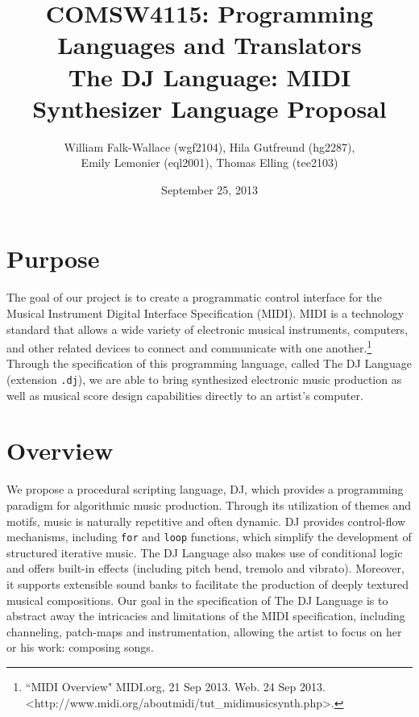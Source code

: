 \documentclass[letterpaper]{article}
\author{William Falk-Wallace (wgf2104), Hila Gutfreund (hg2287), \\Emily Lemonier (eql2001), Thomas Elling (tee2103)}
\title{COMSW4115: Programming Languages and Translators\\The DJ Language: MIDI Synthesizer Language Proposal}
\date{September 25, 2013}
\begin{document}
\maketitle
\tableofcontents 
\pagebreak[4]

\section{Purpose}
The goal of our project is to create a programmatic control interface for the Musical Instrument Digital Interface Specification (MIDI). MIDI is a technology standard that allows a wide variety of electronic musical instruments, computers, and other related devices to connect and communicate with one another.\footnote[1]{``MIDI Overview" MIDI.org, 21 Sep 2013. Web. 24 Sep 2013. \textless http://www.midi.org/aboutmidi/tut\_midimusicsynth.php\textgreater.}  
Through the specification of this programming language, called The DJ Language (extension \texttt{.dj}), we are able to bring synthesized electronic music production as well as musical score design capabilities directly to an artist's computer. 


\section{Overview}

We propose a procedural scripting language, DJ, which provides a programming paradigm for algorithmic music production. Through its utilization of themes and motifs, music is naturally repetitive and often dynamic. DJ provides control-flow mechanisms, including \texttt{for} and \texttt{loop} functions, which simplify the development of structured iterative music. The DJ Language also makes use of conditional logic and offers built-in effects (including pitch bend, tremolo and vibrato). Moreover, it supports extensible sound banks to facilitate the production of deeply textured musical compositions. Our goal in the specification of The DJ Language is to abstract away the intricacies and limitations of the MIDI specification, including channeling, patch-maps and instrumentation, allowing the artist to focus on her or his work: composing songs. %
\end{document}
